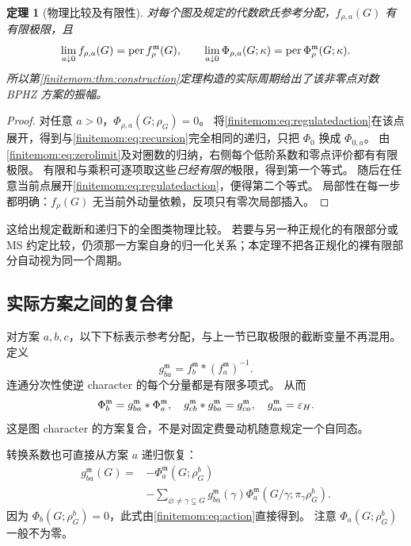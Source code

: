 \documentclass[11pt,a4paper,oneside]{ctexart}
\theoremstyle{cnplain}
\newtheorem{theorem}{定理}[section]
\theoremstyle{definition}
\theoremstyle{remark}
\numberwithin{equation}{section}
\begin{document}
\begin{theorem}[物理比较及有限性]\label{finitemom:thm:physical}
对每个图及规定的代数欧氏参考分配，$f_{\rho,a}(G)$ 有有限极限，且
\begin{equation}\label{finitemom:eq:physical}
 \lim_{a\downarrow0} f_{\rho,a}(G)=\operatorname{per} f_\rho^{\mathfrak m}(G),
 \qquad
 \lim_{a\downarrow0}\Phi_{\rho,a}(G;\kappa)
                         =\operatorname{per}\Phi_\rho^{\mathfrak m}(G;\kappa).
\end{equation}
所以第\ref{finitemom:thm:construction}定理构造的实际周期给出了该非零点对数 BPHZ 方案的振幅。
\end{theorem}
\begin{proof}
对任意 $a>0$，$\Phi_{\rho,a}(G;\rho_G)=0$。
将\eqref{finitemom:eq:regulatedaction}在该点展开，得到与\eqref{finitemom:eq:recursion}完全相同的递归，只把 $\Phi_0$ 换成 $\Phi_{0,a}$。
由\eqref{finitemom:eq:zerolimit}及对圈数的归纳，右侧每个低阶系数和零点评价都有有限极限。
有限和与乘积可逐项取这些\emph{已经有限的}极限，得到第一个等式。
随后在任意当前点展开\eqref{finitemom:eq:regulatedaction}，便得第二个等式。
局部性在每一步都明确：$f_\rho(G)$ 无当前外动量依赖，反项只有零次局部插入。
\end{proof}

这给出规定截断和递归下的全图类物理比较。
若要与另一种正规化的有限部分或 MS 约定比较，仍须那一方案自身的归一化关系；本定理不把各正规化的裸有限部分自动视为同一个周期。


\subsection{实际方案之间的复合律}
对方案 $a,b,c$，以下下标表示参考分配，与上一节已取极限的截断变量不再混用。
定义
\begin{equation}\label{finitemom:eq:transition}
 g_{ba}^{\mathfrak m}=f_b^{\mathfrak m}*(f_a^{\mathfrak m})^{-1}.
\end{equation}
连通分次性使逆 character 的每个分量都是有限多项式。
从而
\begin{equation}\label{finitemom:eq:cocycle}
 \Phi_b^{\mathfrak m}=g_{ba}^{\mathfrak m}*\Phi_a^{\mathfrak m},
 \quad g_{cb}^{\mathfrak m}*g_{ba}^{\mathfrak m}=g_{ca}^{\mathfrak m},
 \quad g_{aa}^{\mathfrak m}=\varepsilon_H.
\end{equation}
这是图 character 的方案复合，不是对固定费曼动机随意规定一个自同态。

转换系数也可直接从方案 $a$ 递归恢复：
\begin{align}\label{finitemom:eq:directtransition}
 g_{ba}^{\mathfrak m}(G)={}&-\Phi_a^{\mathfrak m}(G;\rho_G^b)\nonumber\\
 &-\sum_{\varnothing\ne\gamma\subsetneq G}
 g_{ba}^{\mathfrak m}(\gamma)
 \Phi_a^{\mathfrak m}(G/\gamma;\pi_\gamma\rho_G^b).
\end{align}
因为 $\Phi_b(G;\rho_G^b)=0$，此式由\eqref{finitemom:eq:action}直接得到。
注意 $\Phi_a(G;\rho_G^b)$ 一般不为零。
\end{document}
